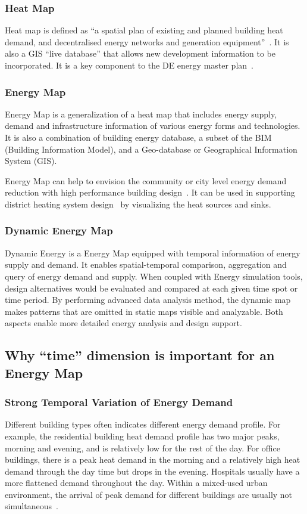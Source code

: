 \documentclass[hidelinks,12pt]{article}
\begin{document}
\subsubsection{Heat Map}
Heat map is defined as ``a spatial plan of existing and planned
building heat demand, and decentralised energy networks and generation
equipment''~\cite{decentralHeatMap2011}. It is also a GIS ``live
database'' that allows new development information to be
incorporated. It is a key component to the DE energy master
plan~\cite{decentralHeatMap2011}.

\subsubsection{Energy Map}
Energy Map is a generalization of a heat map that includes energy
supply, demand and infrastructure information of various energy forms
and technologies. It is also a combination of building energy
database, a subset of the BIM (Building Information Model), and a
Geo-database or Geographical Information System (GIS). 

Energy Map can help to envision the community or city level energy
demand reduction with high performance building
design~\cite{aacip2009}. It can be used in supporting district heating
system design~\cite{decentralHeatMap2011, Finney2012165} by
visualizing the heat sources and sinks.

\subsubsection{Dynamic Energy Map}
Dynamic Energy is a Energy Map equipped with temporal information of
energy supply and demand. It enables spatial-temporal comparison,
aggregation and query of energy demand and supply. When coupled with
Energy simulation tools, design alternatives would be evaluated and
compared at each given time spot or time period. By performing
advanced data analysis method, the dynamic map makes patterns that are
omitted in static maps visible and analyzable. Both aspects enable
more detailed energy analysis and design support.

\subsection{Why ``time'' dimension is important for an Energy Map}
\subsubsection{Strong Temporal Variation of Energy Demand}
Different building types often indicates different energy demand
profile. For example, the residential building heat demand profile has
two major peaks, morning and evening, and is relatively low for the
rest of the day. For office buildings, there is a peak heat demand in
the morning and a relatively high heat demand through the day time but
drops in the evening. Hospitals usually have a more flattened demand
throughout the day. Within a mixed-used urban environment, the arrival
of peak demand for different buildings are usually not
simultaneous~\cite{decentralHeatMap2011}.
\end{document}
